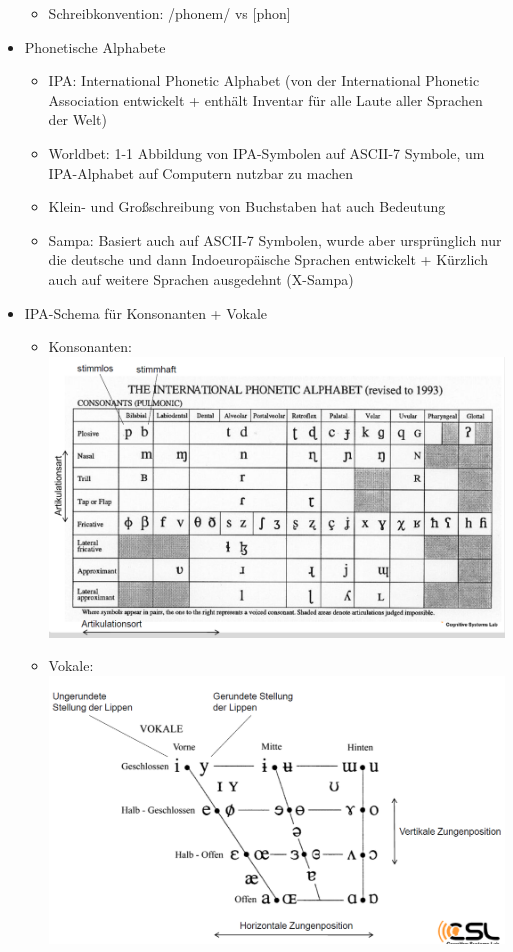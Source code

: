 \documentclass[a4paper,10pt,oneside]{article}
\begin{document}
\begin{itemize}
\begin{itemize}
				\item Schreibkonvention: /phonem/ vs [phon]
			\end{itemize}
		\item Phonetische Alphabete
			\begin{itemize}
				\item IPA: International Phonetic Alphabet (von der International Phonetic Association entwickelt + enthält Inventar für alle Laute aller Sprachen der Welt)
				\item Worldbet: 1-1 Abbildung von IPA-Symbolen auf ASCII-7 Symbole, um IPA-Alphabet auf Computern nutzbar zu machen
				\item Klein- und Großschreibung von Buchstaben hat auch Bedeutung
				\item Sampa: Basiert auch auf ASCII-7 Symbolen, wurde aber ursprünglich nur die deutsche und dann Indoeuropäische Sprachen entwickelt + Kürzlich auch auf weitere Sprachen ausgedehnt (X-Sampa)
			\end{itemize}
		\item IPA-Schema für Konsonanten + Vokale
			\begin{itemize}
				\item[] Konsonanten: \includegraphics[scale=0.15]{Grafiken/1238.png}
				\item[] Vokale: \includegraphics[scale=0.15]{Grafiken/1239.png}

\end{itemize}
\end{itemize}
\end{document}
